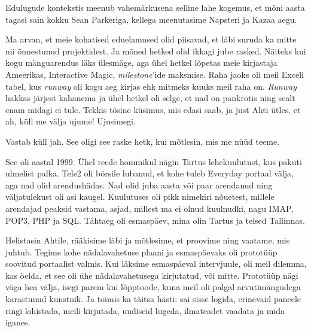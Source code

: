 
Edulugude kontekstis meenub vahemärkusena selline lahe kogemus, et mõni aasta tagasi sain kokku Sean Parkeriga, kellega 
meenutasime Napsteri ja Kazaa aegu.

Ma arvan, et meie kohatised eduelamused olid piisavad, et läbi 
suruda ka mitte nii õnnestunud projektidest. Ja mõned hetked olid ikkagi 
jube rasked. Näiteks kui kogu mänguarendus läks 
ülesmäge, aga ühel hetkel lõpetas meie kirjastaja Ameerikas, Interactive 
Magic, \emph{milestone}'ide maksmise. Raha jaoks oli meil Exceli tabel, kus 
\emph{runway} oli kogu aeg kirjas ehk mitmeks kuuks meil raha on.
\emph{Runway} hakkas järjest kahanema ja ühel hetkel oli selge, et nad on 
pankrotis ning sealt enam midagi ei tule. Tekkis tõsine küsimus, mis edasi 
saab, ja just Ahti ütles, et ah, 
küll me välja ujume! Ujusimegi.


Vastab küll jah. See oligi see raske hetk, kui mõtlesin, mis 
me nüüd teeme.


See oli aastal 1999. Ühel reede hommikul nägin Tartus 
lehekuulutust, kus pakuti ulmelist palka. Tele2 oli 
börsile lubanud, et kohe tuleb Everyday portaal välja, aga nad olid arendushädas. Nad olid juba aasta või 
paar arendanud ning väljatulekust oli asi kaugel. Kuulutuses oli pikk nimekiri 
nõuetest, millele arendajad peaksid vastama, asjad, millest 
ma ei olnud kuulnudki, nagu IMAP, POP3, PHP ja SQL. Tähtaeg oli esmaspäev, mina olin Tartus ja teised 
Tallinnas. 

Helistasin Ahtile, rääkisime 
läbi ja mõtlesime, et proovime ning vaatame, mis juhtub. Tegime kohe nädalavahetuse 
plaani ja esmaspäevaks oli prototüüp soovitud portaalist valmis. Kui läksime esmaspäeval intervjuule, oli meil dilemma, 
kas öelda, et see oli ühe nädalavahetusega kirjutatud, või mitte. Prototüüp nägi 
väga hea välja, isegi parem kui lõpptoode, kuna meil oli palgal arvutimängudega karastunud kunstnik. Ja toimis 
ka täitsa hästi: sai sisse logida, erinevaid paneele ringi lohistada, meili 
kirjutada, uudiseid lugeda, ilmateadet vaadata ja mida iganes. 


